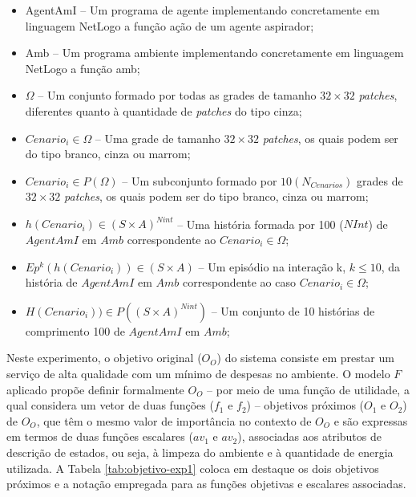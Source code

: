\begin{itemize}
    \item AgentAmI -- Um programa de agente implementando concretamente em linguagem NetLogo a função ação de um agente aspirador;
    
    \item Amb -- Um programa ambiente implementando concretamente em linguagem NetLogo a função amb;

    
    \item $\Omega$ -- Um conjunto formado por todas as grades de tamanho $32 \times 32$ \textit{patches}, diferentes quanto à quantidade de \textit{patches} do tipo cinza;
    
    \item $Cenario_i \in \Omega$ -- Uma grade de tamanho $32 \times 32$ \textit{patches}, os quais podem ser do tipo branco, cinza ou marrom; 
    
    \item $Cenario_i \in P(\Omega)$ -- Um subconjunto formado por $10 (N_{Cenarios})$ grades de $32 \times 32$ \textit{patches}, os quais podem ser do tipo branco, cinza ou marrom;
    
    \item $h(Cenario_i) \in (S\times A)^{Nint}$ -- Uma história formada por 100 ($NInt$) de $AgentAmI$ em $Amb$ correspondente ao $Cenario_i \in \Omega$; 
    
    \item $Ep^k(h(Cenario_i)) \in (S\times A)$ -- Um episódio na interação k, $k \leq 10$, da história de $AgentAmI$ em $Amb$ correspondente ao caso $Cenario_i \in \Omega$;
    
    \item $H(Cenario_i)) \in P((S\times A)^{Nint})$ -- Um conjunto de 10 histórias de comprimento 100 de $AgentAmI$ em $Amb$;
    
\end{itemize}

Neste experimento, o objetivo original ($O_O$) do sistema consiste em prestar um serviço de alta qualidade com um mínimo de despesas no ambiente. O modelo $F$ aplicado propõe definir formalmente $O_O$ -- por meio de uma função de utilidade, a qual considera um vetor de duas funções ($f_1$ e $f_2$) -- objetivos próximos ($O_1$ e $O_2$) de $O_O$, que têm o mesmo valor de importância no contexto de $O_O$ e são expressas em termos de duas funções escalares ($av_1$ e $av_2$), associadas aos atributos de descrição de estados, ou seja, à limpeza do ambiente e à quantidade de energia utilizada. A Tabela \ref{tab:objetivo-exp1} coloca em destaque os dois objetivos próximos e a notação empregada para as funções objetivas e escalares associadas.

